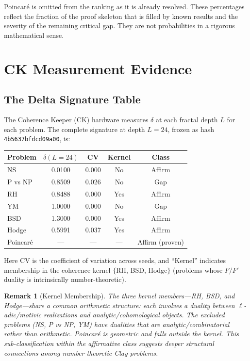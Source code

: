\documentclass[11pt]{article}
\newtheorem{remark}[theorem]{Remark}
\begin{document}
\noindent
Poincar\'e is omitted from the ranking as it is already resolved.
These percentages reflect the fraction of the proof skeleton that is
filled by known results and the severity of the remaining critical gap.
They are not probabilities in a rigorous mathematical sense.

\section{CK Measurement Evidence}
\label{sec:evidence}

\subsection{The Delta Signature Table}
\label{subsec:delta-table}

The Coherence Keeper (CK) hardware measures $\delta$ at each fractal
depth $L$ for each problem.  The complete signature at depth $L = 24$,
frozen as hash \texttt{4b5637bfdcd09a00}, is:

\begin{center}
\begin{tabular}{@{}lcccc@{}}
\toprule
Problem & $\delta(L{=}24)$ & CV & Kernel & Class \\
\midrule
NS & 0.0100 & 0.000 & No & Affirm \\
P vs NP & 0.8509 & 0.026 & No & Gap \\
RH & 0.8488 & 0.000 & Yes & Affirm \\
YM & 1.0000 & 0.000 & No & Gap \\
BSD & 1.3000 & 0.000 & Yes & Affirm \\
Hodge & 0.5991 & 0.037 & Yes & Affirm \\
Poincar\'e & --- & --- & --- & Affirm (proven) \\
\bottomrule
\end{tabular}
\end{center}

\noindent
Here CV is the coefficient of variation across seeds, and ``Kernel''
indicates membership in the coherence kernel $\{$RH, BSD, Hodge$\}$
(problems whose $F/F'$ duality is intrinsically number-theoretic).

\begin{remark}[Kernel Membership]
The three kernel members---RH, BSD, and Hodge---share a common
arithmetic structure: each involves a duality between
$\ell$-adic/motivic realizations and analytic/cohomological objects.
The excluded problems (NS, P vs NP, YM) have dualities that are
analytic/combinatorial rather than arithmetic.  Poincar\'e is
geometric and falls outside the kernel.  This sub-classification
within the affirmative class suggests deeper structural connections
among number-theoretic Clay problems.
\end{remark}
\end{document}
